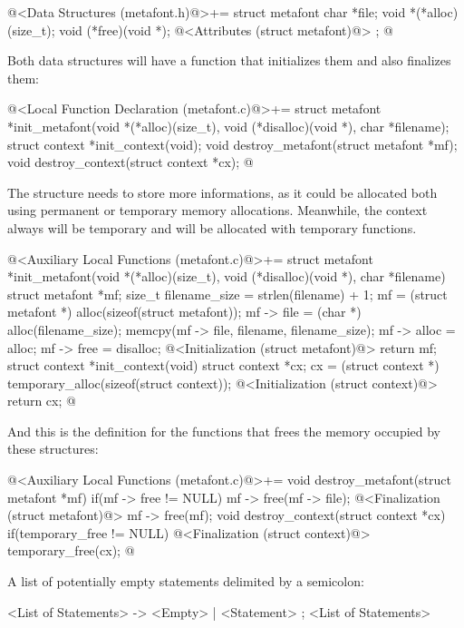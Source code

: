 \iniciocodigo
@<Data Structures (metafont.h)@>+=
struct metafont{
  char *file;
  void *(*alloc)(size_t);
  void (*free)(void *);
  @<Attributes (struct metafont)@>
};
@
\fimcodigo

Both data structures will have a function that initializes them and
also finalizes them:

\iniciocodigo
@<Local Function Declaration (metafont.c)@>+=
struct metafont *init_metafont(void *(*alloc)(size_t),
                              void (*disalloc)(void *),
                              char *filename);
struct context *init_context(void);
void destroy_metafont(struct metafont *mf);
void destroy_context(struct context *cx);
@
\fimcodigo

The structure  needs to store more informations,
as it could be allocated both using permanent or temporary memory
allocations. Meanwhile, the context always will be temporary and will
be allocated with temporary functions.

\iniciocodigo
@<Auxiliary Local Functions (metafont.c)@>+=
struct metafont *init_metafont(void *(*alloc)(size_t),
                              void (*disalloc)(void *),
                              char *filename){
  struct metafont *mf;
  size_t filename_size = strlen(filename) + 1;
  mf = (struct metafont *) alloc(sizeof(struct metafont));
  mf -> file = (char *) alloc(filename_size);
  memcpy(mf -> file, filename, filename_size);
  mf -> alloc = alloc;
  mf -> free = disalloc;
  @<Initialization (struct metafont)@>
  return mf;
}
struct context *init_context(void){
  struct context *cx;
  cx = (struct context *) temporary_alloc(sizeof(struct context));
  @<Initialization (struct context)@>
  return cx;
}
@
\fimcodigo

And this is the definition for the functions that frees the memory
occupied by these structures:

\iniciocodigo
@<Auxiliary Local Functions (metafont.c)@>+=
void destroy_metafont(struct metafont *mf){
  if(mf -> free != NULL){
    mf -> free(mf -> file);
    @<Finalization (struct metafont)@>
    mf -> free(mf);
  }
}
void destroy_context(struct context *cx){
  if(temporary_free != NULL){
    @<Finalization (struct context)@>
    temporary_free(cx);
  }
}
@
\fimcodigo



A list of potentially empty statements delimited by a semicolon:

\alinhaverbatim
<List of Statements> -> <Empty> | <Statement> ; <List of Statements>
\alinhanormal

